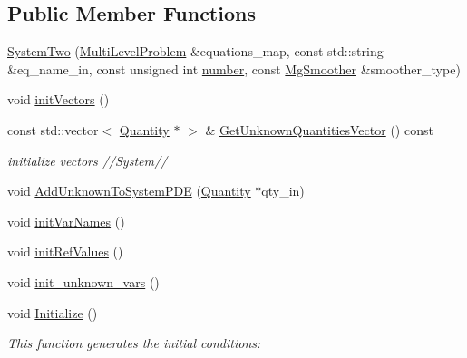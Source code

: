 \subsection*{Public Member Functions}
\begin{DoxyCompactItemize}
\item 
\mbox{\hyperlink{classfemus_1_1_system_two_a1b9575a28f58e2c2b1978165258fc754}{System\+Two}} (\mbox{\hyperlink{classfemus_1_1_multi_level_problem}{Multi\+Level\+Problem}} \&equations\+\_\+map, const std\+::string \&eq\+\_\+name\+\_\+in, const unsigned int \mbox{\hyperlink{classfemus_1_1_system_a28f5c7f6286dd597ae28a8923c8dca11}{number}}, const \mbox{\hyperlink{_mg_smoother_enum_8hpp_a4d11c2ff93e2f0f440c879a9c40cda71}{Mg\+Smoother}} \&smoother\+\_\+type)
\item 
void \mbox{\hyperlink{classfemus_1_1_system_two_a82f4d2f08994b9ca9bbde7f625ace806}{init\+Vectors}} ()
\item 
const std\+::vector$<$ \mbox{\hyperlink{classfemus_1_1_quantity}{Quantity}} $\ast$ $>$ \& \mbox{\hyperlink{classfemus_1_1_system_two_aaadd0133fb394bd3938a76d8d1888883}{Get\+Unknown\+Quantities\+Vector}} () const
\begin{DoxyCompactList}\small\item\em initialize vectors //\+System// \end{DoxyCompactList}\item 
void \mbox{\hyperlink{classfemus_1_1_system_two_a34293cf806f9758e32d6bbbd232088b2}{Add\+Unknown\+To\+System\+P\+DE}} (\mbox{\hyperlink{classfemus_1_1_quantity}{Quantity}} $\ast$qty\+\_\+in)
\item 
void \mbox{\hyperlink{classfemus_1_1_system_two_a53517124388a61411b493d53aeca42e9}{init\+Var\+Names}} ()
\item 
void \mbox{\hyperlink{classfemus_1_1_system_two_a7147efa42fdf4fa7f820a05e8e69a0ef}{init\+Ref\+Values}} ()
\item 
void \mbox{\hyperlink{classfemus_1_1_system_two_a99f560fca648af0fd7897f9f05bf353b}{init\+\_\+unknown\+\_\+vars}} ()
\item 
void \mbox{\hyperlink{classfemus_1_1_system_two_ab0256de1760f7ec1eeabc79983bae956}{Initialize}} ()
\begin{DoxyCompactList}\small\item\em This function generates the initial conditions\+: \end{DoxyCompactList}\end{DoxyCompactItemize}
